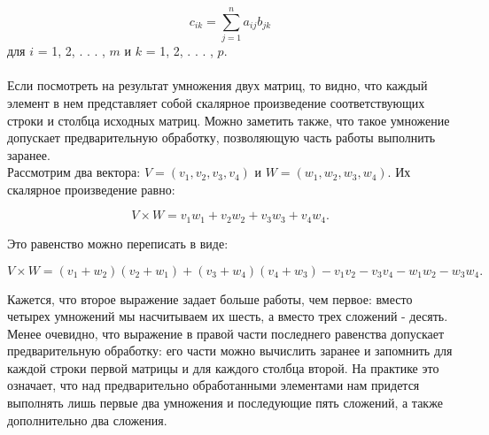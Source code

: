 \documentclass[a4paper,12pt]{article}
\begin{document}
\begin{equation}
c_{ik} = \sum \limits_{j=1}^{n} a_{ij}b_{jk}
\end{equation}
для $i$ = 1, 2, . . . , $m$ и $k$ = 1, 2, . . . , $p$. \\
\\
Если посмотреть на результат умножения двух матриц, то видно, что каждый элемент в нем представляет собой скалярное произведение соответствующих строки и столбца исходных матриц. Можно заметить также, что такое умножение допускает предварительную обработку, позволяющую часть работы выполнить заранее. \\
Рассмотрим два вектора: $V = (v_1, v_2, v_3, v_4)$ и $W = (w_1, w_2, w_3, w_4)$. Их скалярное произведение равно:
\begin{center}
\begin{equation}
V × W = v_1w_1 + v_2w_2 + v_3w_3 + v_4w_4.
\end{equation}
\end{center}
Это равенство можно переписать в виде:
\begin{center}
\begin{equation}
V × W = (v_1 + w_2)(v_2 + w_1) + (v_3 + w_4)(v_4 + w_3) - v_1v_2 - v_3v_4 - w_1w_2 - w_3w_4.
\end{equation}
\end{center}
Кажется, что второе выражение задает больше работы, чем первое: вместо четырех умножений мы насчитываем их шесть, а вместо трех сложений - десять. Менее очевидно, что выражение в правой части последнего равенства допускает предварительную обработку: его части можно вычислить заранее и запомнить для каждой строки первой матрицы и для каждого столбца второй. На практике это означает, что над предварительно обработанными элементами нам придется выполнять лишь первые два умножения и последующие пять сложений, а также дополнительно два сложения. 

\newpage
\end{document}
